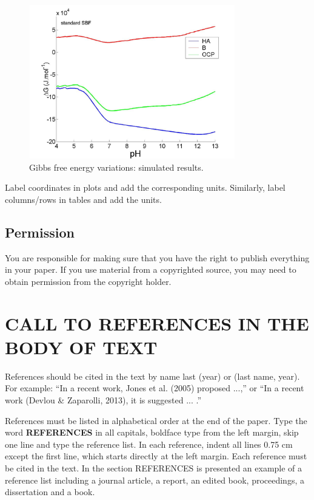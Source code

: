 \documentclass[12pt,fleqn]{article}
\begin{document}
\begin{figure}[!htbp] %
\vspace{-2pt}
\begin{center}
\includegraphics[height=6.7cm,width=9cm]{figura_1}%
\caption{Gibbs free energy variations: simulated results.}
\label{fig1}%
\end{center}
\end{figure}

Label coordinates in plots and add the corresponding units. Similarly, label columns/rows in tables and add the units.

\subsection{Permission}
You are responsible for making sure that you have the right to publish everything in your paper. If you use material from a copyrighted source, you may need to obtain permission from the copyright holder.

\section{CALL TO REFERENCES IN THE BODY OF TEXT}
References should be cited in the text by name last (year) or (last name, year). For example: ``In a recent work, Jones et al. (2005) proposed ...,'' or ``In a recent work (Devlou \& Zaparolli, 2013), it is suggested ... .''

References must be listed in alphabetical order at the end of the paper. Type the word \textbf{REFERENCES} in all capitals, boldface type from the left margin, skip one line and type the reference list. In each reference, indent all lines 0.75 cm except the first line, which starts directly at the left margin. Each reference must be cited in the text. In the section REFERENCES is presented an example of a reference list including a journal article, a report, an edited book, proceedings, a dissertation and a book.
\end{document}
